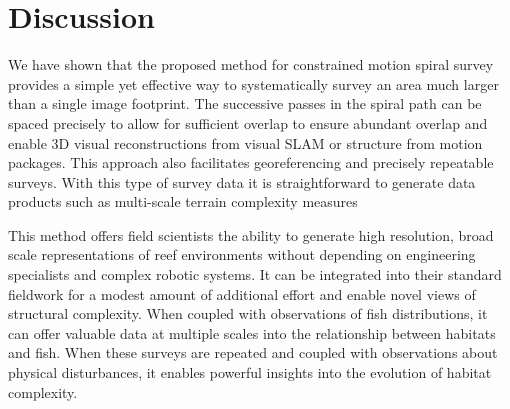 \section{Discussion}
We have shown that the proposed method for constrained motion spiral survey provides a simple yet effective way to systematically survey an area much larger than a single image footprint. The successive passes in the spiral path can be spaced precisely to allow for sufficient overlap to ensure abundant overlap and enable 3D visual reconstructions from visual SLAM or structure from motion packages. This approach also facilitates georeferencing and precisely repeatable surveys. With this type of survey data it is straightforward to generate data products such as multi-scale terrain complexity measures \cite{Friedman_2012}

This method offers field scientists the ability to generate high resolution, broad scale representations of reef environments without depending on engineering specialists and complex robotic systems. It can be integrated into their standard fieldwork for a modest amount of additional effort and enable novel views of structural complexity. When coupled with observations of fish distributions, it can offer valuable data at multiple scales into the relationship between habitats and fish. When these surveys are repeated and coupled with observations about physical disturbances, it enables powerful insights into the evolution of habitat complexity.

